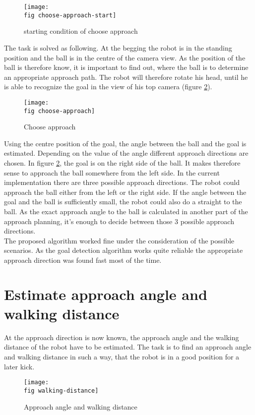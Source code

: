 \begin{figure}[ht]
	\texttt{[image: \\fig choose-approach-start]}
	\caption{starting condition of choose approach}
	\label{j figure starting condition choose-approach}
\end{figure}

The task is solved as following. At the begging the robot is in the standing position and the ball is in the centre of the camera view. As the position of the ball is therefore know, it is important to find out, where the ball is to determine an appropriate approach path. The robot will therefore rotate his head, until he is able to recognize the goal in the view of his top camera (figure \ref{j figure choose-approach}).

\begin{figure}[ht]
	\texttt{[image: \\fig choose-approach]}
	\caption{Choose approach}
	\label{j figure choose-approach}
\end{figure}

Using the centre position of the goal, the angle between the ball and the goal is estimated. Depending on the value of the angle different approach directions are chosen. In figure \ref{j figure choose-approach}, the goal is on the right side of the ball. It makes therefore sense to approach the ball somewhere from the left side. In the current implementation there are three possible approach directions. The robot could approach the ball either from the left or the right side. If the angle between the goal and the ball is sufficiently small, the robot could also do a straight to the ball. As the exact approach angle to the ball is calculated in another part of the approach planning, it's enough to decide between those 3 possible approach directions.\\
The proposed algorithm worked fine under the consideration of the possible scenarios. As the goal detection algorithm works quite reliable the appropriate approach direction was found fast most of the time.
\newpage
\section{Estimate approach angle and walking distance}
At the approach direction is now known, the approach angle and the walking distance of the robot have to be estimated. The task is to find an approach angle and walking distance in such a way, that the robot is in a good position for a later kick.

\begin{figure}[ht]
	\texttt{[image: \\fig walking-distance]}
	\caption{Approach angle and walking distance}
	\label{j figure approach angle and walking distance}
\end{figure}

